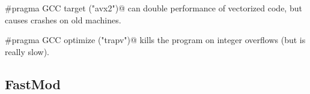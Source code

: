		\verb@#pragma GCC target ("avx2")@ can double performance of vectorized code, but causes crashes on old machines.
		
		\verb@#pragma GCC optimize ("trapv")@ kills the program on integer overflows (but is really slow).
	\subsection{FastMod}
